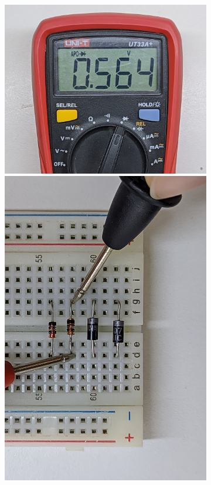 \documentclass[chaptersright]{informeutn}
\begin{document}
\begin{figure}[!ht]
\begin{subfigure}[b]{1\textwidth}
\begin{minipage}[b]{0.24\textwidth}
          \includegraphics[width=1\textwidth]{pictures/mult_diod-2d.jpg}
        \end{minipage}
        \begin{minipage}[b]{0.24\textwidth}
          \centering
          \includegraphics[angle=-90, width=1\textwidth]{pictures/prot_diod-3d.jpg}

\end{minipage}
\end{subfigure}
\end{figure}
\end{document}
